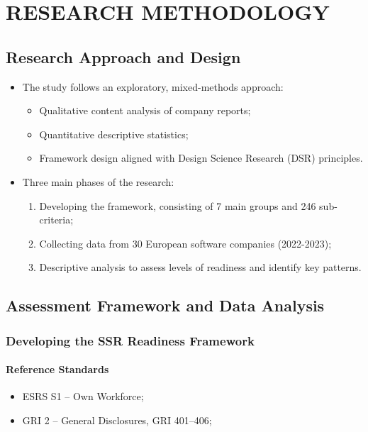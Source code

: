 \chapter{RESEARCH METHODOLOGY}

\section{Research Approach and Design}

\begin{itemize}
    \item The study follows an exploratory, mixed-methods approach:
    \begin{itemize}
        \item Qualitative content analysis of company reports;
        \item Quantitative descriptive statistics;
        \item Framework design aligned with Design Science Research (DSR) principles.
    \end{itemize}
\end{itemize}

\begin{itemize}
    \item Three main phases of the research:
    \begin{enumerate}
        \item Developing the framework, consisting of 7 main groups and 246 sub-criteria;
        \item Collecting data from 30 European software companies (2022-2023);
        \item Descriptive analysis to assess levels of readiness and identify key patterns.
    \end{enumerate}
\end{itemize}



\section{Assessment Framework and Data Analysis}
\subsection{Developing the SSR Readiness Framework}
\subsubsection{Reference Standards}
\begin{itemize}
    \item ESRS S1 -- Own Workforce;
    \item GRI 2 -- General Disclosures, GRI 401--406;
\end{itemize}

